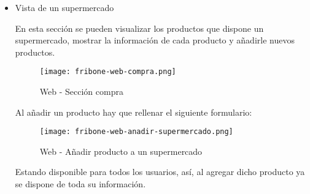\begin{itemize}
\begin{itemize}
                \item Vista de un supermercado

                    En esta sección se pueden visualizar los productos que dispone un supermercado, mostrar la información de cada producto y añadirle nuevos productos.

                    \begin{figure}[H]
                        \centering
                        \texttt{[image: fribone-web-compra.png]}
                        \caption{Web - Sección compra}\label{fig:fribone-web-compra}
                    \end{figure}

                    Al añadir un producto hay que rellenar el siguiente formulario:

                    \begin{figure}[H]
                        \centering
                        \texttt{[image: fribone-web-anadir-supermercado.png]}
                        \caption{Web - Añadir producto a un supermercado}\label{fig:fribone-web-anadir-supermercado}
                    \end{figure}

                    Estando disponible para todos los usuarios, así, al agregar dicho producto ya se dispone de toda su información.
            \end{itemize}
    \end{itemize}